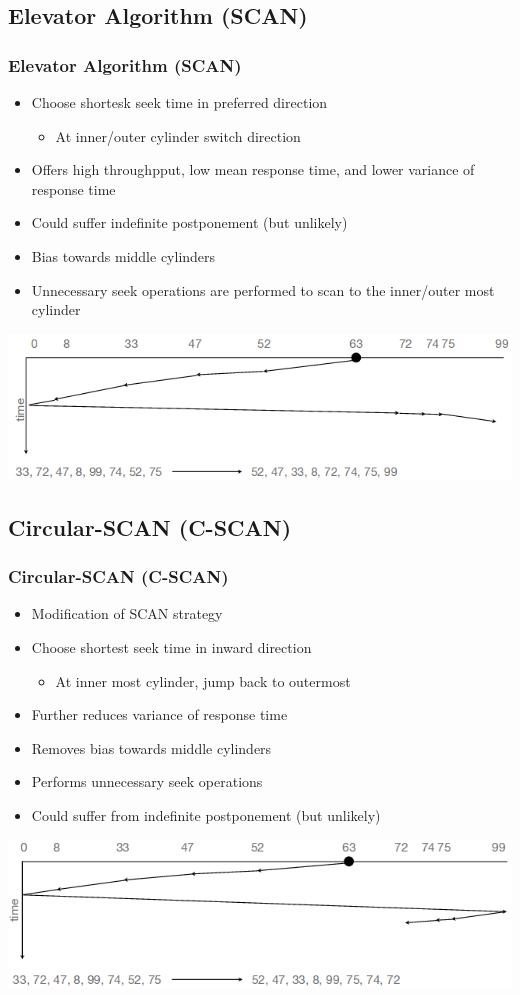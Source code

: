 \documentclass{beamer}
\begin{document}
\subsection{Elevator Algorithm (SCAN)}
\begin{frame}
\frametitle{Elevator Algorithm (SCAN)}
\begin{itemize}
\item Choose shortesk seek time in preferred direction
\begin{itemize}
\item At inner/outer cylinder switch direction
\end{itemize}
\item Offers high throughpput, low mean response time, and lower variance of response time
\item Could suffer indefinite postponement (but unlikely)
\item Bias towards middle cylinders
\item Unnecessary seek operations are performed to scan to the inner/outer most cylinder
\end{itemize}
\includegraphics[scale=0.35]{scan.png}
\end{frame}
\subsection{Circular-SCAN (C-SCAN)}
\begin{frame}
\frametitle{Circular-SCAN (C-SCAN)}
\begin{itemize}
\item Modification of SCAN strategy
\item Choose shortest seek time in inward direction
\begin{itemize}
\item At inner most cylinder, jump back to outermost
\end{itemize}
\item Further reduces variance of response time
\item Removes bias towards middle cylinders
\item Performs unnecessary seek operations
\item Could suffer from indefinite postponement (but unlikely)
\end{itemize}
\includegraphics[scale=0.35]{CSCAN.png}
\end{frame}
\end{document}
